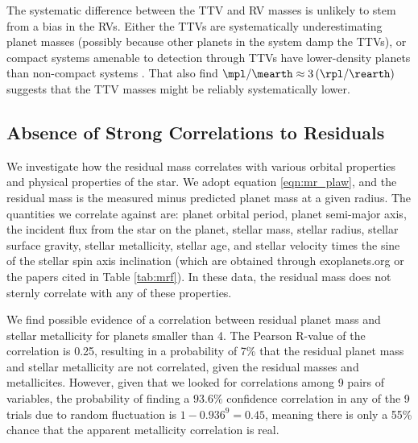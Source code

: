 The systematic difference between the TTV and RV masses is unlikely to stem from a bias in the RVs.  Either the TTVs are systematically underestimating planet masses (possibly because other planets in the system damp the TTVs), or compact systems amenable to detection through TTVs have lower-density planets than non-compact systems \citep[e.g. the Kepler-11 system,][]{Lissauer2013}.  That \citet{WL2013} also find $\mpl/\mearth \approx 3 \left(\rpl/\rearth\right)$ suggests that the TTV masses might be reliably systematically lower.

\subsection{Absence of Strong Correlations to Residuals}
We investigate how the residual mass correlates with various orbital properties and physical properties of the star.  We adopt equation \ref{eqn:mr_plaw}, and the residual mass is the measured minus predicted planet mass at a given radius.  The quantities we correlate against are: planet orbital period, planet semi-major axis, the incident flux from the star on the planet, stellar mass, stellar radius, stellar surface gravity, stellar metallicity, stellar age, and stellar velocity times the sine of the stellar spin axis inclination (which are obtained through exoplanets.org or the papers cited in Table \ref{tab:mrf}).  In these data, the residual mass does not sternly correlate with any of these properties.

We find possible evidence of a correlation between residual planet mass and stellar metallicity for planets smaller than 4\rearth.  The Pearson R-value of the correlation is 0.25, resulting in a probability of 7\% that the residual planet mass and stellar metallicity are not correlated, given the residual masses and metallicites.  However, given that we looked for correlations among 9 pairs of variables, the probability of finding a $93.6\%$ confidence correlation in any of the 9 trials due to random fluctuation is $1 - 0.936^9 = 0.45$, meaning there is only a 55\% chance that the apparent metallicity correlation is real.
